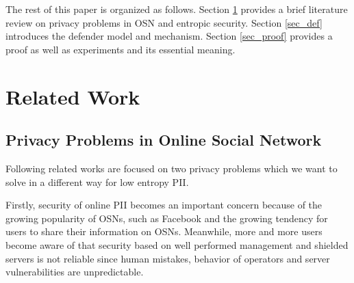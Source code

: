 \documentclass[10pt, conference, compsocconf]{IEEEtran}
\begin{document}
	
	The rest of this paper is organized as follows.
	Section \ref{sec_rw} provides a brief literature review on privacy problems in OSN and 
	entropic security. Section \ref{sec_def} introduces the defender model and mechanism.
	Section \ref{sec_proof} provides a proof as well as experiments and its essential meaning.
	
	
	

\section{Related Work}	\label{sec_rw}
	\subsection{Privacy Problems in Online Social Network}
	Following related works are focused on two privacy problems 
	which we want to solve in a different way for low entropy PII.	
	
	Firstly, security of online PII becomes an important concern \cite{lzf1, lzf2} because
	of the growing popularity of OSNs, such as Facebook and
	the growing tendency for users to share their information
	on OSNs.
	Meanwhile, more and more users
	become aware of that security based on well performed 
	management and shielded
	servers is not reliable since human mistakes, behavior of operators and server 
	vulnerabilities are unpredictable. 
	
\end{document}
